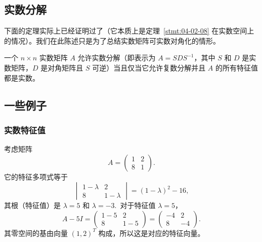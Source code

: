 \subsection{实数分解}\label{sec:04-02-06}

下面的定理实际上已经证明过了（它本质上是定理~\ref{stmt:04-02-08} 在实数空间上的情况）。我们在此陈述只是为了总结实数矩阵可实数对角化的情形。

\begin{theorem}\label{stmt:04-02-09} 一个 $n \times n$ 实数矩阵 $A$ 允许实数分解（即表示为 $A = SDS^{-1}$，其中 $S$ 和 $D$ 是实数矩阵，$D$ 是对角矩阵且 $S$ 可逆）当且仅当它允许复数分解并且 $A$ 的所有特征值都是实数。\end{theorem}

\subsection{一些例子}\label{sec:04-02-07}

\subsubsection{实数特征值}\label{sec:04-02-07-01}

考虑矩阵
$$A = \begin{pmatrix} 1 & 2 \\ 8 & 1 \end{pmatrix}.$$
它的特征多项式等于
$$\begin{vmatrix} 1-\lambda & 2 \\ 8 & 1-\lambda \end{vmatrix} = (1-\lambda)^2 - 16,$$
其根（特征值）是 $\lambda = 5$ 和 $\lambda = -3$.~对于特征值 $\lambda = 5$，
$$A - 5I = \begin{pmatrix} 1-5 & 2 \\ 8 & 1-5 \end{pmatrix} = \begin{pmatrix} -4 & 2 \\ 8 & -4 \end{pmatrix}.$$
其零空间的基由向量 $(1, 2)^T$ 构成，所以这是对应的特征向量。

